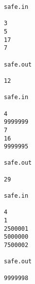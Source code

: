 \begin{verbatim}
safe.in 
 
3 
5 
17 
7 
 
safe.out 
 
12 

safe.in 
 
4 
9999999 
7 
16 
9999995 
 
safe.out 
 
29

safe.in 
 
4 
1 
2500001 
5000000 
7500002 
 
safe.out 
 
9999998 

\end{verbatim}